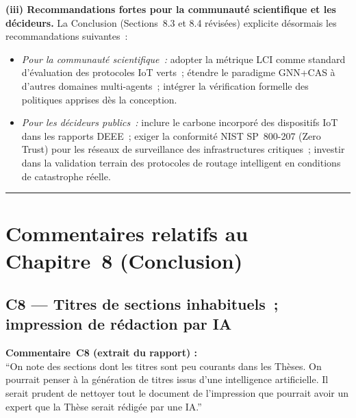 \documentclass[12pt,a4paper]{article}
\newcommand{\Commentaire}[2]{%
  \begin{reviewerbox}
    \textbf{Commentaire~#1 (extrait du rapport) :}\\#2
  \end{reviewerbox}%
}
\begin{document}
{\textbf{(iii) Recommandations fortes pour la communauté scientifique et les décideurs.}
La Conclusion (Sections~8.3 et 8.4 révisées) explicite désormais les recommandations suivantes~:
\begin{itemize}[leftmargin=*]
  \item \textit{Pour la communauté scientifique~:} adopter la métrique LCI comme standard d'évaluation des protocoles IoT verts~; étendre le paradigme GNN+CAS à d'autres domaines multi-agents~; intégrer la vérification formelle des politiques apprises dès la conception.
  \item \textit{Pour les décideurs publics~:} inclure le carbone incorporé des dispositifs IoT dans les rapports DEEE~; exiger la conformité NIST SP~800-207 (Zero Trust) pour les réseaux de surveillance des infrastructures critiques~; investir dans la validation terrain des protocoles de routage intelligent en conditions de catastrophe réelle.
\end{itemize}
}

\bigskip
\hrule
\bigskip

\section*{Commentaires relatifs au Chapitre~8 (Conclusion)}

\subsection*{C8 --- Titres de sections inhabituels~; impression de rédaction par IA}

\Commentaire{C8}{
  ``On note des sections dont les titres sont peu courants dans les Thèses. On pourrait penser à la
  génération de titres issus d'une intelligence artificielle. Il serait prudent de nettoyer tout le
  document de l'impression que pourrait avoir un expert que la Thèse serait rédigée par une IA.''
}
\end{document}
